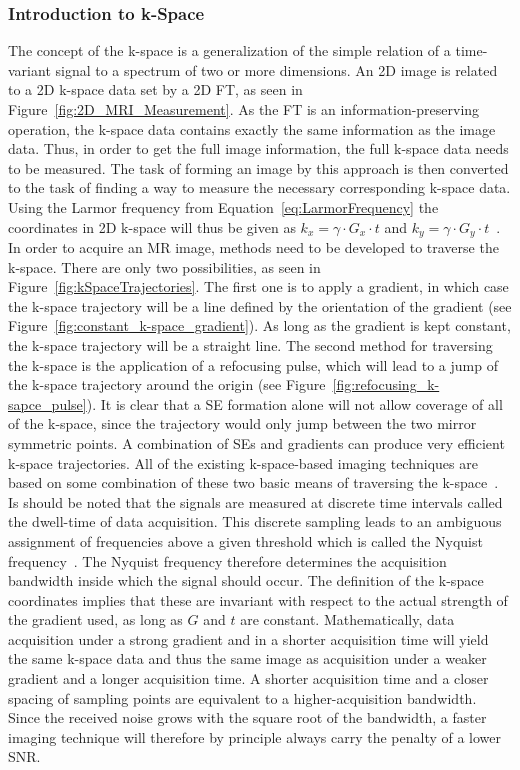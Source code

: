 \subsubsection{Introduction to k-Space}
The concept of the k-space is a generalization of the simple relation of a time-variant signal to a spectrum of two or more dimensions. An 2D image is related to a 2D k-space data set by a 2D FT, as seen in Figure~\ref{fig:2D_MRI_Measurement}. As the FT is an information-preserving operation, the k-space data contains exactly the same information as the image data. Thus, in order to get the full image information, the full k-space data needs to be measured. The task of forming an image by this approach is then converted to the task of finding a way to measure the necessary corresponding k-space data. Using the Larmor frequency from Equation~\ref{eq:LarmorFrequency} the coordinates in 2D k-space will thus be given as $k_x = \gamma \cdot G_x \cdot t$ and $k_y = \gamma \cdot G_y \cdot t$~\cite{SamplingStrategies}. \\
In order to acquire an MR image, methods need to be developed to traverse the k-space. There are only two possibilities, as seen in Figure~\ref{fig:kSpaceTrajectories}. The first one is to apply a gradient, in which case the k-space trajectory will be a line defined by the orientation of the gradient (see Figure~\ref{fig:constant_k-space_gradient}). As long as the gradient is kept constant, the k-space trajectory will be a straight line. The second method for traversing the k-space is the application of a refocusing pulse, which will lead to a jump of the k-space trajectory around the origin (see Figure~\ref{fig:refocusing_k-sapce_pulse}). It is clear that a SE formation alone will not allow coverage of all of the k-space, since the trajectory would only jump between the two mirror symmetric points. A combination of SEs and gradients can produce very efficient k-space trajectories. All of the existing k-space-based imaging techniques are based on some combination of these two basic means of traversing the k-space~\cite{SamplingStrategies}. \\
Is should be noted that the signals are measured at discrete time intervals called the dwell-time of data acquisition. This discrete sampling leads to an ambiguous assignment of frequencies above a given threshold which is called the Nyquist frequency~\cite{SamplingStrategies}. The Nyquist frequency therefore determines the acquisition bandwidth inside which the signal should occur. The definition of the k-space coordinates implies that these are invariant with respect to the actual strength of the gradient used, as long as $G$ and $t$ are constant. Mathematically, data acquisition under a strong gradient and in a shorter acquisition time will yield the same k-space data and thus the same image as acquisition under a weaker gradient and a longer acquisition time. A shorter acquisition time and a closer spacing of sampling points are equivalent to a higher-acquisition bandwidth. Since the received noise grows with the square root of the bandwidth, a faster imaging technique will therefore by principle always carry the penalty of a lower SNR.
